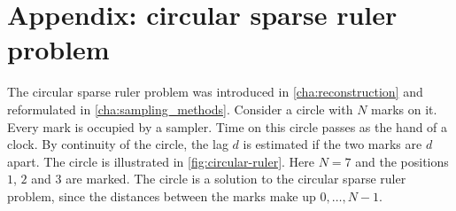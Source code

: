 \documentclass[a4paper, openany, oneside]{memoir}
\begin{document}
\section{Appendix: circular sparse ruler problem}
\label{ap:circ-ruler}

The circular sparse ruler problem was introduced in \cref{cha:reconstruction} and reformulated in \cref{cha:sampling_methods}. Consider a circle with $N$ marks on it. Every mark is occupied by a sampler. Time on this circle passes as the hand of a clock. By continuity of the circle, the lag $d$ is estimated if the two marks are $d$ apart. The circle is illustrated in \cref{fig:circular-ruler}. Here $N=7$ and the positions $1$, $2$ and $3$ are marked. The circle is a solution to the circular sparse ruler problem, since the distances between the marks make up $0,\ldots,N-1$.
\end{document}
